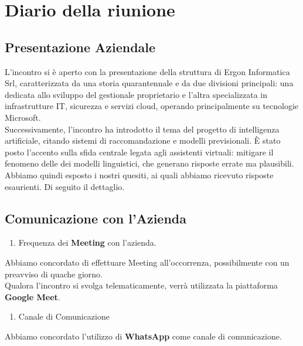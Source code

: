 \section{Diario della riunione}
\subsection{Presentazione Aziendale}
L'incontro si è aperto con la presentazione della struttura di Ergon Informatica Srl, caratterizzata da una storia quarantennale e da due divisioni principali: una dedicata allo sviluppo del gestionale proprietario  e l'altra specializzata in infrastrutture IT, sicurezza e servizi cloud, operando principalmente su tecnologie Microsoft.\\
Successivamente, l'incontro ha introdotto il tema del progetto di intelligenza artificiale, citando sistemi di raccomandazione e modelli previsionali. È stato posto l'accento sulla sfida centrale legata agli assistenti virtuali: mitigare il fenomeno delle  dei modelli linguistici, che generano risposte errate ma plausibili.\\
Abbiamo quindi esposto i nostri quesiti, ai quali abbiamo ricevuto risposte esaurienti. Di seguito il dettaglio.

\subsection{Comunicazione con l'Azienda}
    \begin{enumerate}[label=\arabic*., itemsep=0pt, parsep=1pt, leftmargin=*]
        \item Frequenza dei \textbf{Meeting} con l'azienda.
    \end{enumerate} \vspace{-0.5em}
    Abbiamo concordato di effettuare Meeting all'occorrenza, possibilmente con un preavviso di quache giorno.\\
    Qualora l’incontro si svolga telematicamente, verrà utilizzata la piattaforma \textbf{Google Meet}.

    \begin{enumerate}[resume*, itemsep=0pt, parsep=1pt, leftmargin=*, label=\arabic*.]
        \item Canale di Comunicazione
    \end{enumerate} \vspace{-0.5em}
    Abbiamo concordato l'utilizzo di \textbf{WhatsApp} come canale di comunicazione.

